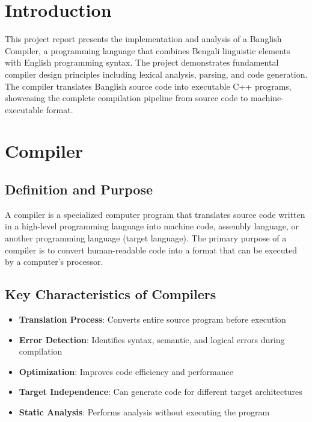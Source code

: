 \documentclass[12pt,a4paper]{article}
\begin{document}
\tableofcontents
\newpage

\section{Introduction}

This project report presents the implementation and analysis of a Banglish Compiler, a programming language that combines Bengali linguistic elements with English programming syntax. The project demonstrates fundamental compiler design principles including lexical analysis, parsing, and code generation. The compiler translates Banglish source code into executable C++ programs, showcasing the complete compilation pipeline from source code to machine-executable format.

\section{Compiler}

\subsection{Definition and Purpose}

A compiler is a specialized computer program that translates source code written in a high-level programming language into machine code, assembly language, or another programming language (target language). The primary purpose of a compiler is to convert human-readable code into a format that can be executed by a computer's processor.

\subsection{Key Characteristics of Compilers}

\begin{itemize}
    \item \textbf{Translation Process}: Converts entire source program before execution
    \item \textbf{Error Detection}: Identifies syntax, semantic, and logical errors during compilation
    \item \textbf{Optimization}: Improves code efficiency and performance
    \item \textbf{Target Independence}: Can generate code for different target architectures
    \item \textbf{Static Analysis}: Performs analysis without executing the program
\end{itemize}
\end{document}
